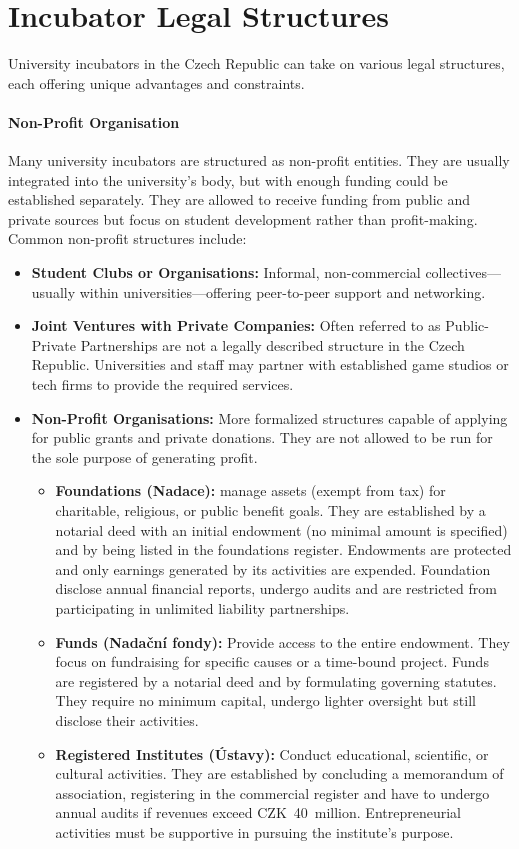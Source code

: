 \section{Incubator Legal Structures}
University incubators in the Czech Republic can take on various legal structures, each offering unique advantages and constraints.

\paragraph{Non-Profit Organisation}
Many university incubators are structured as non-profit entities. They are usually integrated into the university's body, but with enough funding could be established separately. They are allowed to receive funding from public and private sources but focus on student development rather than profit-making. Common non-profit structures include:
\begin{itemize}
    \item \textbf{Student Clubs or Organisations:} Informal, non-commercial collectives---usually within universities---offering peer-to-peer support and networking. \cite{lily-NONPROFIT}
    \item \textbf{Joint Ventures with Private Companies:} Often referred to as Public-Private Partnerships are not a legally described structure in the Czech Republic. Universities and staff may partner with established game studios or tech firms to provide the required services. \cite{lily-NONPROFIT}
    \item \textbf{Non-Profit Organisations:} More formalized structures capable of applying for public grants and private donations. They are not allowed to be run for the sole purpose of generating profit. \cite{lily-NONPROFIT}
    \begin{itemize}
        \item \textbf{Foundations (Nadace):} manage assets (exempt from tax) for charitable, religious, or public benefit goals. They are established by a notarial deed with an initial endowment (no minimal amount is specified) and by being listed in the foundations register. Endowments are protected and only earnings generated by its activities are expended. Foundation disclose annual financial reports, undergo audits and are restricted from participating in unlimited liability partnerships.
        \item \textbf{Funds (Nadační fondy):} Provide access to the entire endowment. They focus on fundraising for specific causes or a time-bound project. Funds are registered by a notarial deed and by formulating governing statutes. They require no minimum capital, undergo lighter oversight but still disclose their activities.
        \item \textbf{Registered Institutes (Ústavy):} Conduct educational, scientific, or cultural activities. They are established by concluding a memorandum of association, registering in the commercial register and have to undergo annual audits if revenues exceed CZK~40~million. Entrepreneurial activities must be supportive in pursuing the institute’s purpose.
    \end{itemize}
\end{itemize}

